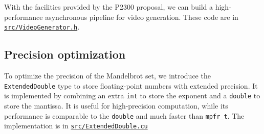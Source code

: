 \documentclass[11pt]{article}
\begin{document}
    \vspace{0.5cm}

    With the facilities provided by the P2300 proposal, we can build a high-performance asynchronous pipeline for video
    generation.
    These code are in \href{https://github.com/AI1379/MandelbrotSet/blob/master/src/VideoGenerator.h}
    {\texttt{src/VideoGenerator.h}}.

    \subsection{Precision optimization}\label{subsec:precision-optimization}

    To optimize the precision of the Mandelbrot set, we introduce the \texttt{ExtendedDouble}
    type to store floating-point numbers with extended precision.
    It is implemented by combining an extra \texttt{int} to store the exponent and a \texttt{double}
    to store the mantissa.
    It is useful for high-precision computation, while its performance is comparable to the \texttt{double}
    and much faster than \texttt{mpfr\_t}.
    The implementation is in \href{https://github.com/AI1379/MandelbrotSet/blob/master/src/ExtendedDouble.cu}
    {\texttt{src/ExtendedDouble.cu}}

    
    
\end{document}
